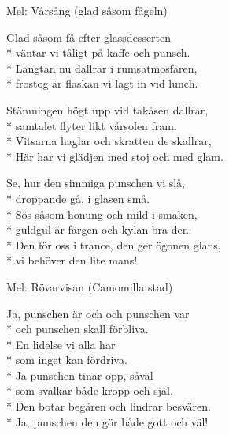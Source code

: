 \begin{SongText}
    \begin{SongInfo}
        Mel: Vårsång (glad såsom fågeln)
    \end{SongInfo}
    \begin{SongVerse}
        Glad såsom få efter glassdesserten\\*%
        väntar vi tåligt på kaffe och punsch.\\*%
        Längtan nu dallrar i rumsatmosfären,\\*%
        frostog är flaskan vi lagt in vid lunch.
    \end{SongVerse}
    \begin{SongVerse}
        Stämningen högt upp vid takåsen dallrar,\\*%
        samtalet flyter likt vårsolen fram.\\*%
        Vitsarna haglar och skratten de skallrar,\\*%
        Här har vi glädjen med stoj och med glam.
    \end{SongVerse}
    \begin{SongVerse}
        Se, hur den simmiga punschen vi slå,\\*%
        droppande gå, i glasen små.\\*%
        Sös såsom honung och mild i smaken,\\*%
        guldgul är färgen och kylan bra den.\\*%
        Den för oss i trance, den ger ögonen glans,\\*%
        vi behöver den lite mans!
    \end{SongVerse}\end{SongText}
\begin{SongText}
    \begin{SongInfo}
        Mel: Rövarvisan (Camomilla stad)
    \end{SongInfo}
    \begin{SongVerse}
        Ja, punschen är och och punschen var\\*%
        och punschen skall förbliva.\\*%
        En lidelse vi alla har\\*%
        som inget kan fördriva.\\*%
        Ja punschen tinar opp, såväl\\*%
        som svalkar både kropp och själ.\\*%
        Den botar begären och lindrar besvären.\\*%
        Ja, punschen den gör både gott och väl!
    \end{SongVerse}\end{SongText}

